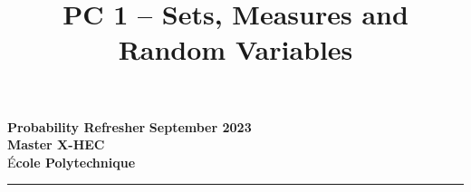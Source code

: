 \documentclass{article}
\title{PC 1 – Sets, Measures and Random Variables}
\author{}
\date{}
\begin{document}
\begin{flushleft}
  \textbf{Probability Refresher} \hfill \textbf{September 2023} \\
  \textbf{Master X-HEC} \hfill \\
  É\textbf{cole Polytechnique} \hfill
\end{flushleft}

{\let\newpage\relax\maketitle}
\vspace{-1.3cm}
\hrule

\vspace{0.5cm}





\end{document}
